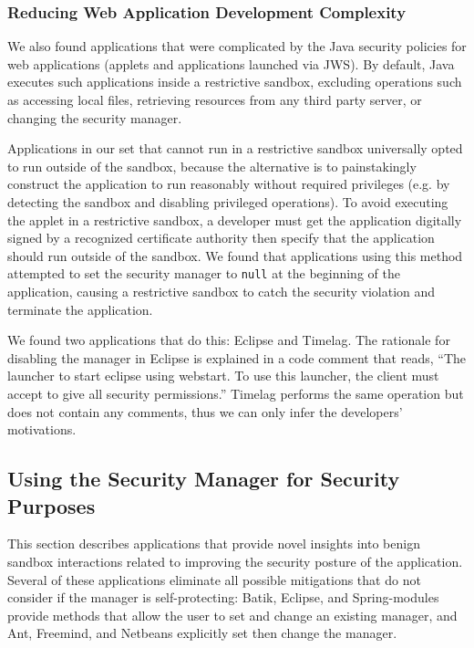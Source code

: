 \documentclass{sig-alternate}
\begin{document}
\subsubsection{Reducing Web Application Development Complexity}\label{sub:Reducing-Web-Application-Complexity}

We also found applications that were complicated by the Java security policies
for web applications (applets and applications launched via JWS). By default,
Java executes such applications inside a restrictive 
sandbox, 
excluding operations such as accessing local files, retrieving resources
from any third party server, or changing the security manager. 

Applications in our set that cannot run in a restrictive sandbox universally
opted to run outside of the sandbox, because the alternative is to painstakingly
construct the application to run reasonably without required privileges (e.g. by
detecting the sandbox and disabling privileged operations). To avoid executing
the applet in a restrictive 
sandbox, a developer must get the application digitally signed
by a recognized certificate authority then specify that the application should
run outside of the sandbox. We found that applications using this method attempted
to set the security manager to \texttt{null} at the beginning of the
application, causing a restrictive sandbox to catch the security violation and
terminate the application.

We found two applications that do this: Eclipse and
Timelag. The rationale for disabling the manager in Eclipse is explained in a
code comment that reads, ``The launcher to start eclipse using webstart. To use
this launcher, the client must accept to give all security permissions.'' Timelag
performs the same operation but does not contain any comments, thus we can only
infer the developers' motivations. 

\subsection{Using the Security Manager for Security Purposes}
\label{sub:Using-the-Security}

This section describes applications that provide novel insights into benign sandbox interactions related to improving the security
posture of the application. Several of these applications eliminate all possible mitigations that do not consider if the manager is self-protecting: Batik, Eclipse, and Spring-modules provide
methods that allow the user to set and change an existing manager,
and Ant, Freemind, and Netbeans explicitly set then change the manager.
\end{document}
